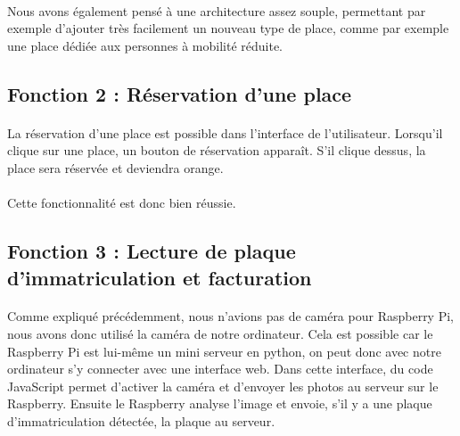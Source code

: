 \paragraph*{}
Nous avons également pensé à une architecture assez souple, permettant par exemple d'ajouter très facilement un nouveau type de place, comme par exemple une place dédiée aux personnes à mobilité réduite.


\subsection{Fonction 2 : Réservation d'une place}

\paragraph*{}
La réservation d'une place est possible dans l'interface de l'utilisateur. Lorsqu'il clique sur une place, un bouton de réservation apparaît. S'il clique dessus, la place sera réservée et deviendra orange. 


\paragraph*{}
Cette fonctionnalité est donc bien réussie.

\subsection{Fonction 3 : Lecture de plaque d'immatriculation et facturation}

\paragraph*{}
Comme expliqué précédemment, nous n'avions pas de caméra pour Raspberry Pi, nous avons donc utilisé la caméra de notre ordinateur. Cela est possible car le Raspberry Pi est lui-même un mini serveur en python, on peut donc avec notre ordinateur s'y connecter avec une interface web. Dans cette interface, du code JavaScript permet d'activer la caméra et d'envoyer les photos au serveur sur le Raspberry. Ensuite le Raspberry analyse l'image et envoie, s'il y a une plaque d'immatriculation détectée, la plaque au serveur. 


